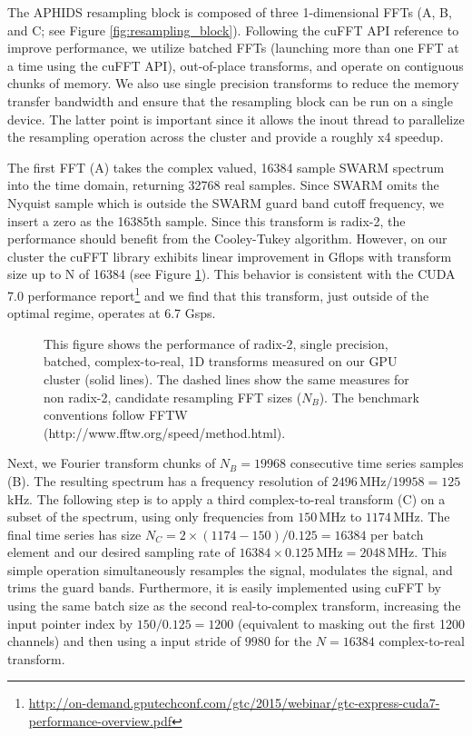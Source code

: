 The APHIDS resampling block is composed of three 1-dimensional FFTs (A, B, and C; see Figure 
\ref{fig:resampling_block}).  Following the cuFFT API reference to improve performance, we utilize batched
FFTs (launching more than one FFT at a time using the cuFFT API), out-of-place transforms, 
and operate on contiguous chunks of memory.  We also use single precision transforms to 
reduce the memory transfer bandwidth and ensure that 
the resampling block can be run on a single device.  The latter point is important since it allows the inout
thread to parallelize the resampling operation across the cluster and provide a roughly x4 speedup.


The first FFT (A) takes the complex valued, 16384 sample SWARM spectrum into the time domain, returning 
32768 real samples.  Since SWARM omits the Nyquist sample which is outside the SWARM guard band cutoff frequency, 
we insert a zero as the 16385th sample.  Since this transform is radix-2, the performance should benefit from 
the Cooley-Tukey algorithm.  However, on our cluster the cuFFT library exhibits linear improvement in Gflops 
with transform size up to N of 16384 (see Figure \ref{fig:C2R_performance}).  This behavior is consistent with 
the CUDA 7.0 performance 
report\footnote{\url{http://on-demand.gputechconf.com/gtc/2015/webinar/gtc-express-cuda7-performance-overview.pdf}} 
and we find that this transform, just outside of the optimal regime, operates at 6.7 Gsps.

\begin{figure}[t!]
\caption{This figure shows the performance of radix-2, single precision, batched, complex-to-real, 1D transforms 
measured on our GPU cluster (solid lines). The dashed lines show the same measures for non radix-2, candidate 
resampling FFT sizes ($N_B$).  The benchmark conventions follow FFTW  (http://www.fftw.org/speed/method.html).}
\label{fig:C2R_performance}
\end{figure}

Next, we Fourier transform chunks of $N_B = 19968$ consecutive time series samples (B).  The resulting 
spectrum has a frequency resolution of $2496$\,MHz$/19958=125$\,kHz.  The following step is to apply a third
complex-to-real transform (C) on a subset of the spectrum, using only frequencies from $150$\,MHz to $1174$\,MHz.  
The final time series has size $N_C= 2\times(1174-150)/0.125=16384$ per batch element and our desired 
sampling rate of 
$16384 \times 0.125$\,MHz$ = 2048$\,MHz.  This simple operation simultaneously resamples the signal, modulates 
the signal, and trims the guard bands.  Furthermore, it is easily implemented using cuFFT by using the same 
batch size as the second real-to-complex transform, increasing the input pointer index by $150 / 0.125 = 1200$
(equivalent to masking out the first 1200 channels) and then using a input stride of $9980$ for the 
$N=16384$ complex-to-real transform.


